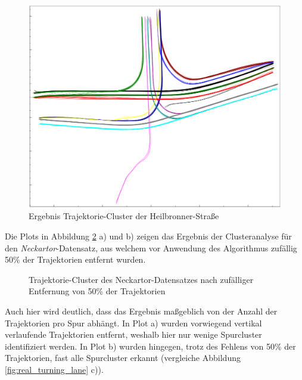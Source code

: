 \begin{figure}[H]
    \centering
    \includegraphics[width=0.35\linewidth]{resources/img/results/Heilbronner/filteredClusters_Heilbronner}
    \caption{Ergebnis Trajektorie-Cluster der Heilbronner-Straße}
    \label{fig:results_clusters_heilbronner}
\end{figure}

Die Plots in Abbildung \ref{fig:results_clusters_neckartor} a) und b) zeigen das Ergebnis der Clusteranalyse für
den \textit{Neckartor}-Datensatz, aus welchem vor Anwendung des Algorithmus zufällig 50\% der Trajektorien entfernt wurden.

\begin{figure}
    \centering
    \qquad \qquad
    \caption[Ergebnisse Test Clusteranalyse auf Neckartor Datensatz]
            {Trajektorie-Cluster des Neckartor-Datensatzes nach zufälliger Entfernung von 50\% der Trajektorien}
    \label{fig:results_clusters_neckartor}
\end{figure}

Auch hier wird deutlich, dass das Ergebnis maßgeblich von der Anzahl der Trajektorien pro Spur abhängt.
In Plot a) wurden vorwiegend vertikal verlaufende Trajektorien entfernt, weshalb hier nur wenige Spurcluster identifiziert werden.
In Plot b) wurden hingegen, trotz des Fehlens von 50\% der Trajektorien, fast alle Spurcluster erkannt
(vergleiche Abbildung \ref{fig:real_turning_lane} c)).

